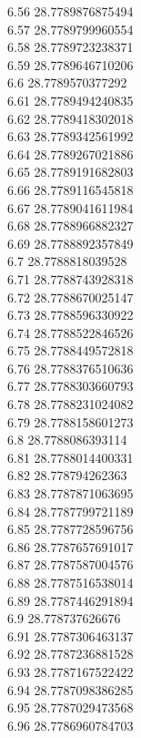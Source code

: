 {6.56	28.7789876875494\\
6.57	28.7789799960554\\
6.58	28.7789723238371\\
6.59	28.7789646710206\\
6.6	28.7789570377292\\
6.61	28.7789494240835\\
6.62	28.7789418302018\\
6.63	28.7789342561992\\
6.64	28.7789267021886\\
6.65	28.7789191682803\\
6.66	28.7789116545818\\
6.67	28.7789041611984\\
6.68	28.7788966882327\\
6.69	28.7788892357849\\
6.7	28.7788818039528\\
6.71	28.7788743928318\\
6.72	28.7788670025147\\
6.73	28.7788596330922\\
6.74	28.7788522846526\\
6.75	28.7788449572818\\
6.76	28.7788376510636\\
6.77	28.7788303660793\\
6.78	28.7788231024082\\
6.79	28.7788158601273\\
6.8	28.7788086393114\\
6.81	28.7788014400331\\
6.82	28.778794262363\\
6.83	28.7787871063695\\
6.84	28.7787799721189\\
6.85	28.7787728596756\\
6.86	28.7787657691017\\
6.87	28.7787587004576\\
6.88	28.7787516538014\\
6.89	28.7787446291894\\
6.9	28.778737626676\\
6.91	28.7787306463137\\
6.92	28.7787236881528\\
6.93	28.7787167522422\\
6.94	28.7787098386285\\
6.95	28.7787029473568\\
6.96	28.7786960784703\\
}
